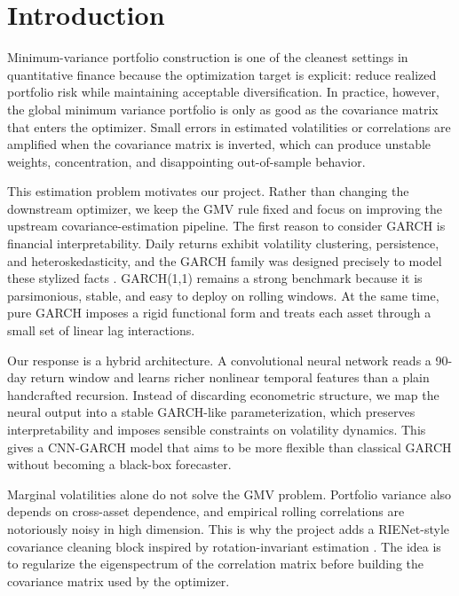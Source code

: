 \documentclass[11pt,a4paper]{article}
\begin{document}
\section{Introduction}

Minimum-variance portfolio construction is one of the cleanest settings in quantitative finance because the optimization target is explicit: reduce realized portfolio risk while maintaining acceptable diversification. In practice, however, the global minimum variance portfolio is only as good as the covariance matrix that enters the optimizer. Small errors in estimated volatilities or correlations are amplified when the covariance matrix is inverted, which can produce unstable weights, concentration, and disappointing out-of-sample behavior.

This estimation problem motivates our project. Rather than changing the downstream optimizer, we keep the GMV rule fixed and focus on improving the upstream covariance-estimation pipeline. The first reason to consider GARCH is financial interpretability. Daily returns exhibit volatility clustering, persistence, and heteroskedasticity, and the GARCH family was designed precisely to model these stylized facts \cite{engle1982,bollerslev1986}. GARCH(1,1) remains a strong benchmark because it is parsimonious, stable, and easy to deploy on rolling windows. At the same time, pure GARCH imposes a rigid functional form and treats each asset through a small set of linear lag interactions.

Our response is a hybrid architecture. A convolutional neural network reads a 90-day return window and learns richer nonlinear temporal features than a plain handcrafted recursion. Instead of discarding econometric structure, we map the neural output into a stable GARCH-like parameterization, which preserves interpretability and imposes sensible constraints on volatility dynamics. This gives a CNN-GARCH model that aims to be more flexible than classical GARCH without becoming a black-box forecaster.

Marginal volatilities alone do not solve the GMV problem. Portfolio variance also depends on cross-asset dependence, and empirical rolling correlations are notoriously noisy in high dimension. This is why the project adds a RIENet-style covariance cleaning block inspired by rotation-invariant estimation \cite{ledoit2004,bongiorno2025e2e}. The idea is to regularize the eigenspectrum of the correlation matrix before building the covariance matrix used by the optimizer.
\end{document}
